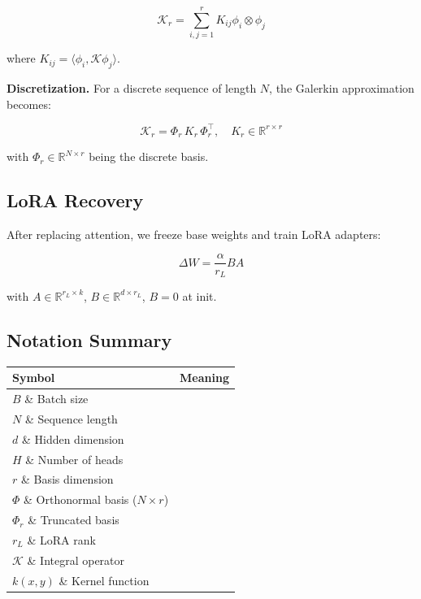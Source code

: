 \[
\mathcal{K}_r = \sum_{i, j = 1}^r K_{ij} \phi_i \otimes \phi_j
\]

where $K_{ij} = \langle \phi_i, \mathcal{K} \phi_j \rangle$.

\textbf{Discretization.} For a discrete sequence of length $N$, the Galerkin 
approximation becomes:

\[
\mathcal{K}_r = \Phi_r \, K_r \, \Phi_r^\top, \quad
K_r \in \mathbb{R}^{r \times r}
\]

with $\Phi_r \in \mathbb{R}^{N \times r}$ being the discrete basis.

\subsection{LoRA Recovery}

After replacing attention, we freeze base weights and train LoRA adapters:

\[
\Delta W = \frac{\alpha}{r_L} B A
\]

with $A \in \mathbb{R}^{r_L \times k}$, $B \in \mathbb{R}^{d \times r_L}$, 
$B = 0$ at init.

\subsection{Notation Summary}

\begin{table}[H]
\centering
\small
\begin{tabular}{ll}
\toprule
\textbf{Symbol} & \textbf{Meaning} \\
\midrule
$B$ \& Batch size \\
$N$ \& Sequence length \\
$d$ \& Hidden dimension \\
$H$ \& Number of heads \\
$r$ \& Basis dimension \\
$\Phi$ \& Orthonormal basis ($N \times r$) \\
$\Phi_r$ \& Truncated basis \\
$r_L$ \& LoRA rank \\
$\mathcal{K}$ \& Integral operator \\
$k(x, y)$ \& Kernel function \\
\bottomrule
\end{tabular}
\end{table}

